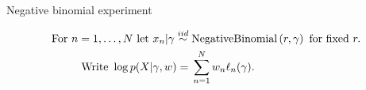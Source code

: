 \begin{frame}{Negative binomial experiment}

    \begin{align*}
    \textrm{For }n={} 1,\ldots, N \textrm{ let }
        x_n |  \gamma \overset{iid}{\sim}{}& \textrm{NegativeBinomial}\left(r, \gamma \right)
        \textrm{ for fixed }r.\\
    \textrm{Write }\log p(X \vert \gamma, w) ={}&
           \sum_{n=1}^N w_n \ell_n(\gamma).
    \end{align*}
    \pause
    \LowDimAccuracyGraph{}
\end{frame}
        



